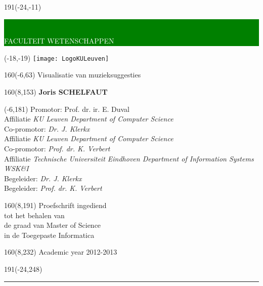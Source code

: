 \documentclass[12pt,a4paper,oneside]{book}
\begin{document}
\thispagestyle{empty}
\newcommand{\form}[1]{\scalebox{1.087}{\boldmath{#1}}}
\sffamily
%
\begin{textblock}{191}(-24,-11)
	\colorbox{green}{\hspace{139mm}\ \parbox[c][18truemm]{52mm}{\textcolor{white}{FACULTEIT WETENSCHAPPEN}}}
\end{textblock}
%
\begin{textblock}{70}(-18,-19)
	\textblockcolour{}
	\texttt{[image: LogoKULeuven]}
\end{textblock}
%
\begin{textblock}{160}(-6,63)
	\textblockcolour{}
	\vspace{-\parskip}
	\flushleft
	\fontsize{40}{42}\selectfont \textcolor{bluetitle}{Visualisatie van muzieksuggesties}\\[1.5mm]
	\fontsize{20}{22}\selectfont {A visueel uitlegsysteem voor collaboratieve filtering}
\end{textblock}

\begin{textblock}{160}(8,153)
\textblockcolour{}
\vspace{-\parskip}
\flushright
\fontsize{14}{16}\selectfont \textbf{Joris SCHELFAUT}
\end{textblock}
%
\begin{textblock}{90}(-6,181)
\textblockcolour{}
\vspace{-\parskip}
\flushleft
Promotor: Prof. dr. ir. E. Duval\\[-2pt]
\textcolor{blueaff}{Affiliatie \textsl{KU Leuven Department of Computer Science}}\\[5pt]
Co-promotor: \textsl{Dr. J. Klerkx}\\[-2pt]
\textcolor{blueaff}{Affiliatie \textsl{KU Leuven Department of Computer Science}}\\[5pt]
Co-promotor: \textsl{Prof. dr. K. Verbert}\\[-2pt]
\textcolor{blueaff}{Affiliatie \textsl{Technische Universiteit Eindhoven Department of Information Systems WSK\&I}}\\[5pt]
Begeleider: \textsl{Dr. J. Klerkx}\\[-2pt]
Begeleider: \textsl{Prof. dr. K. Verbert}\\[-2pt]
\end{textblock}
%
\begin{textblock}{160}(8,191)
\textblockcolour{}
\vspace{-\parskip}
\flushright
Proefschrift ingediend\\[4.5pt]
tot het behalen van\\[4.5pt]
de graad van Master of Science\\[4.5pt]
in de Toegepaste Informatica\\
\end{textblock}
%
\begin{textblock}{160}(8,232)
\textblockcolour{}
\vspace{-\parskip}
\flushright
Academic year 2012-2013
\end{textblock}
%
\begin{textblock}{191}(-24,248)
{\color{blueline}\rule{550pt}{5.5pt}}
\end{textblock}
%
\vfill
\newpage
\end{document}

